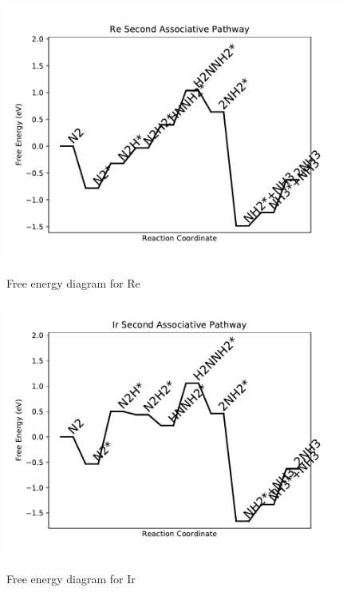 \documentclass{article}
\begin{document}
\begin{figure}
\includegraphics[width=1\linewidth]{data/plots/Re_associative_2.pdf}
\label{fig:Re_associative_2}
\caption{Free energy diagram for Re}
\end{figure}

\begin{figure}
\includegraphics[width=1\linewidth]{data/plots/Ir_associative_2.pdf}
\label{fig:Ir_associative_2}
\caption{Free energy diagram for Ir}
\end{figure}
\end{document}
